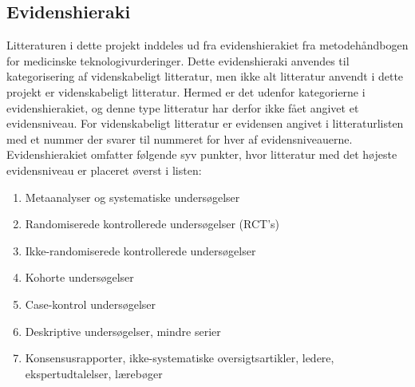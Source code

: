 \subsection{Evidenshieraki}
Litteraturen i dette projekt inddeles ud fra evidenshierakiet fra metodehåndbogen for medicinske teknologivurderinger. \citep{metodehaandbogen} Dette evidenshieraki anvendes til kategorisering af videnskabeligt litteratur, men ikke alt litteratur anvendt i dette projekt er videnskabeligt litteratur. Hermed er det udenfor kategorierne i evidenshierakiet, og denne type litteratur har derfor ikke fået angivet et evidensniveau. For videnskabeligt litteratur er evidensen angivet i litteraturlisten med et nummer der svarer til nummeret for hver af evidensniveauerne. \\
Evidenshierakiet omfatter følgende syv punkter, hvor litteratur med det højeste evidensniveau er placeret øverst i listen:

\begin{enumerate}
\item Metaanalyser og systematiske undersøgelser
\item Randomiserede kontrollerede undersøgelser (RCT’s)
\item Ikke-randomiserede kontrollerede undersøgelser
\item Kohorte undersøgelser
\item Case-kontrol undersøgelser
\item Deskriptive undersøgelser, mindre serier
\item Konsensusrapporter, ikke-systematiske oversigtsartikler, ledere, ekspertudtalelser, lærebøger
\end{enumerate}

